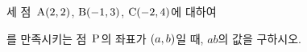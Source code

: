 세 점~$\mathrm{A}(2{,}\mkern3mu\mathopen{}2)$, $\mathrm{B}(-1{,}\mkern3mu\mathopen{}3)$, $\mathrm{C}(-2{,}\mkern3mu\mathopen{}4)$에 대하여 \par\smallskip{}\par\smallskip\noindent 를 만족시키는 점~$\mathrm{P}$의 좌표가 $(a{,}\mkern3mu\mathopen{}b)$일 때, $ab$의 값을 구하시오.
